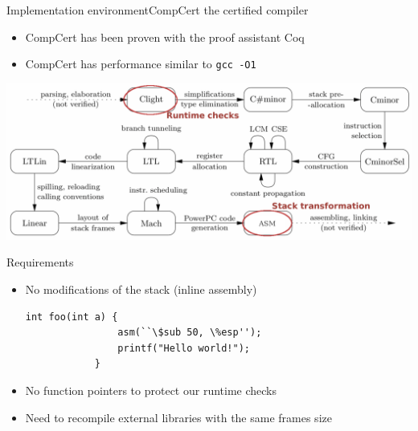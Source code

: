 \documentclass{beamer}
\begin{document}
%
%

\begin{frame}[c]{Implementation environment}{CompCert the certified compiler~\cite{Leroy:2009:FVR:1538788.1538814}}
	\begin{itemize}
		\item CompCert has been proven with the proof assistant Coq
		\item CompCert has performance similar to \texttt{gcc -O1}
	\end{itemize}
	\hfill \break
	\includegraphics[width=\textwidth]{images/compcert_pass.pdf}
\end{frame}

\begin{frame}[fragile]{Requirements}
	\begin{itemize}
		\item No modifications of the stack (inline assembly)
			\begin{lstlisting}[tabsize=2,frame=single,linewidth=7cm]
			int foo(int a) {
				asm(``\$sub 50, \%esp'');
				printf("Hello world!");
			}
			\end{lstlisting}
		\item No function pointers to protect our runtime checks
		\item Need to recompile external libraries with the same frames size
	\end{itemize}
\end{frame}
\end{document}
